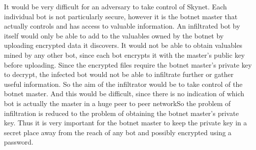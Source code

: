 \documentclass[9pt,a4paper]{article}
\begin{document}
It would be very difficult for an adversary to take control of Skynet. Each individual bot is not particularly secure, however it is the botnet master that actually controls and has access to valuable information.
An infiltrated bot by itself would only be able to add to the valuables owned by the botnet by uploading encrypted data it discovers. It would not be able to obtain valuables mined by any other bot, since each bot encrypts it with the master's public key before uploading. Since the encrypted files require the botnet master's private key to decrypt, the infected bot would not be able to infiltrate further or gather useful information.
So the aim of the infiltrator would be to  take control of the botnet master. And this would be difficult, since there is no indication of which bot is actually the master in a huge peer to peer networkSo the problem of infiltration is reduced to the problem of obtaining the botnet master's private key. Thus it is very important for the botnet master to keep the private key in a secret place away from the reach of any bot and possibly encrypted using a password.
\end{document}
